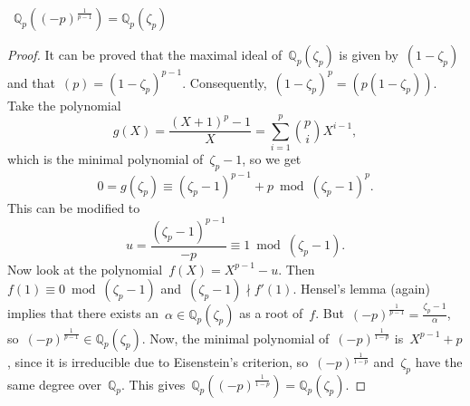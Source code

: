 \begin{lemma}
 ~$\mathbb{Q}_p((-p)^{\frac{1}{p-1}}) = \mathbb{Q}_p(\zeta_p)$

  \begin{proof}
    It can be proved that the maximal ideal of~$\mathbb{Q}_p(\zeta_p)$ is given by~$(1-\zeta_p)$ and that~$(p) = (1-\zeta_p)^{p-1}$. Consequently,~$(1-\zeta_p)^p = (p(1-\zeta_p))$. Take the polynomial
    \begin{equation}
      g(X) = \frac{(X+1)^p-1}{X}=\sum_{i=1}^{p} \binom{p}{i}X^{i-1}, 
    \end{equation}
    which is the minimal polynomial of~$\zeta_p-1$, so we get
    \begin{equation}
      0 = g(\zeta_p) \equiv (\zeta_p-1)^{p-1}+p \bmod (\zeta_p-1)^p. 
    \end{equation}
    This can be modified to
    \begin{equation}
      u = \frac{(\zeta_p-1)^{p-1}}{-p} \equiv 1 \bmod (\zeta_p-1).
    \end{equation}
    Now look at the polynomial~$f(X) = X^{p-1}- u$. Then~$f(1) \equiv 0 \bmod (\zeta_p - 1)$ and~$(\zeta_p - 1)\nmid f'(1)$. Hensel's lemma (again) implies that there exists an~$\alpha \in \mathbb{Q}_p(\zeta_p)$ as a root of~$f$. But~$(-p)^{\frac{1}{p-1}} = \frac{\zeta_p-1}{\alpha}$, so~$(-p)^{\frac{1}{p-1}} \in \mathbb{Q}_p(\zeta_p)$. Now, the minimal polynomial of~$(-p)^{\frac{1}{1-p}}$ is~$X^{p-1}+p$, since it is irreducible due to Eisenstein's criterion, so~$(-p)^{\frac{1}{1-p}}$ and~$\zeta_p$ have the same degree over~$\mathbb{Q}_p$. This gives~$\mathbb{Q}_p((-p)^{\frac{1}{1-p}}) = \mathbb{Q}_p(\zeta_{p})$.
  \end{proof}
\end{lemma}

